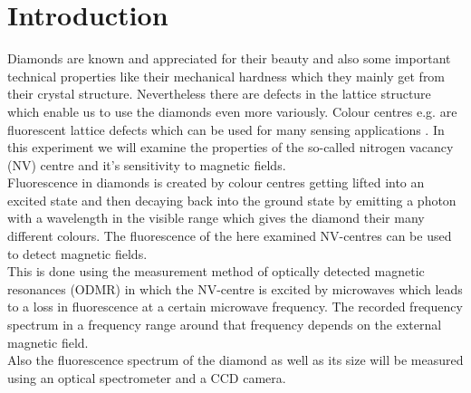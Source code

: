 \section{Introduction}

Diamonds are known and appreciated for their beauty and also some important technical properties like their mechanical hardness which they mainly get from their crystal structure. Nevertheless there are defects in the lattice structure which enable us to use the diamonds even more variously. Colour centres e.g. are fluorescent lattice defects which can be used for many sensing applications \cite{anleitung}. In this experiment we will examine the properties of the so-called nitrogen vacancy (NV) centre and it's sensitivity to magnetic fields.\\

Fluorescence in diamonds is created by colour centres getting lifted into an excited state and then decaying back into the ground state by emitting a photon with a wavelength in the visible range which gives the diamond their many different colours. The fluorescence of the here examined NV-centres can be used to detect magnetic fields.\\

This is done using the measurement method of optically detected magnetic resonances (ODMR) in which the NV-centre is excited by microwaves which leads to a loss in fluorescence at a certain microwave frequency. The recorded frequency spectrum in a frequency range around that frequency depends on the external magnetic field.\\

Also the fluorescence spectrum of the diamond as well as its size will be measured using an optical spectrometer and a CCD camera.